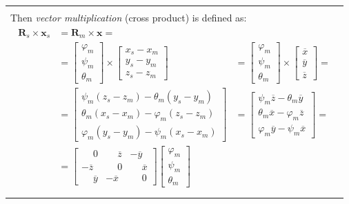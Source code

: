 \documentclass[10pt,b5paper,titlepage]{book}
\newcommand{\m}{\mathbf}
\newenvironment{bbox}[1][0.96]
{
    \begin{center}
        \begin{tabular}{|p{#1\textwidth}|}
            \hline\\
}
{
            \\\\\hline
        \end{tabular}
    \end{center}
}
\newenvironment{eqarray}
{
    \begin{eqnarray}
        \begin{aligned}
}
{
        \end{aligned}
    \end{eqnarray}
}
\begin{document}
\begin{bbox}[0.95]
    Then \textit{vector multiplication} (cross product) is defined as:
    \begin{eqarray}
        \m{R}_s \times \m{x}_s
        &= \m{R}_m \times \m{x} = & \\
        &= \begin{bmatrix}
             \varphi_m \\
             \psi_m \\
             \theta_m
           \end{bmatrix} \times \begin{bmatrix}
             x_s - x_m \\
             y_s - y_m \\
             z_s - z_m
           \end{bmatrix}
        &= \begin{bmatrix}
             \varphi_m \\
             \psi_m \\
             \theta_m
           \end{bmatrix} \times \begin{bmatrix}
             \overline{x} \\
             \overline{y} \\
             \overline{z}
           \end{bmatrix} = \\
        &= \begin{bmatrix}
             \psi_m (z_s - z_m ) - \theta_m (y_s - y_m) \\
             \theta_m (x_s - x_m) - \varphi_m (z_s - z_m) \\
             \varphi_m (y_s - y_m) - \psi_m (x_s - x_m)
           \end{bmatrix}
        &= \begin{bmatrix}
            \psi_m \overline{z} - \theta_m \overline{y} \\
            \theta_m \overline{x} - \varphi_m \overline{z} \\
            \varphi_m \overline{y} - \psi_m \overline{x}
        \end{bmatrix} = \\
        &= \begin{bmatrix}
            \phantom{-}0 & \phantom{-}\overline{z} & -\overline{y} \\
            -\overline{z} & \phantom{-}0 & \phantom{-}\overline{x} \\
            \phantom{-}\overline{y} & -\overline{x} & \phantom{-}0
        \end{bmatrix}
        \begin{bmatrix}
            \varphi_m \\
            \psi_m \\
            \theta_m
        \end{bmatrix}
    \end{eqarray}
\end{bbox}
\end{document}
